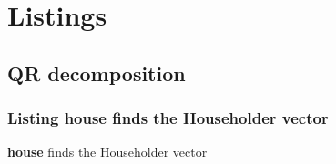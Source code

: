 \documentclass[11pt]{article}
\newcommand{\readcode}[3]
{
	\subsubsection{Listing \textbf{#1} #2}
	\textbf{#1} #2 #3}, label={rc:#1}]{#1.m}
}
\begin{document}
\section{Listings}
\subsection{QR decomposition}

\readcode{house}{finds the Householder vector}{}


\nocite{*}



\end{document}
